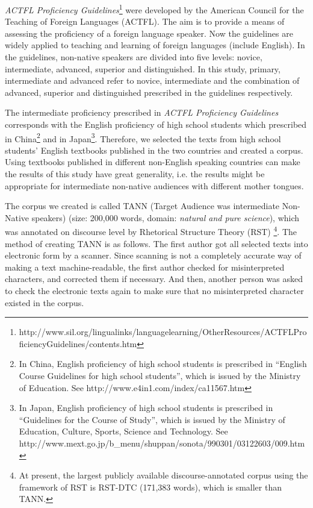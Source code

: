 \documentclass[english]{jnlp_1.3e}
\begin{document}
\textit{ACTFL Proficiency Guidelines}\footnote{http://www.sil.org/lingualinks/languagelearning/OtherResources/ACTFLProficiencyGuidelines/contents.htm} were developed by the American Council for the Teaching of
Foreign Languages (ACTFL). The aim is to provide a means of assessing the proficiency of
a foreign language speaker. Now the guidelines are widely applied to teaching and learning of
foreign languages (include English). In the guidelines, non-native speakers are divided into
five levels: novice, intermediate, advanced, superior and distinguished. In this study, primary, intermediate
and advanced refer to novice, intermediate and the combination of advanced, superior and distinguished 
prescribed in the guidelines respectively.

The intermediate proficiency prescribed in \textit{ACTFL Proficiency Guidelines} corresponds
with the English proficiency of high school students which prescribed in China\footnote{In China, English proficiency of high school students is prescribed in ``English Course Guidelines for high school students'', which is issued by the Ministry of Education. See http://www.e4in1.com/index/ca11567.htm} and in Japan\footnote{In Japan, English proficiency of high school students is prescribed in ``Guidelines for the Course of Study'', which is issued by the Ministry of Education, Culture, Sports, Science and Technology. See http://www.mext.go.jp/b\_menu/shuppan/sonota/990301/03122603/009.htm}.
Therefore, we selected the texts from high school students' English textbooks published in
the two countries and created a corpus. Using textbooks published in different non-English
speaking countries can make the results of this study have great generality, i.e. the results
might be appropriate for intermediate non-native audiences with different mother tongues.

The corpus we created is called TANN (Target Audience was intermediate Non-Native speakers) 
(size: 200,000 words, domain: \textit{natural and pure science}),
which was annotated on discourse level by Rhetorical
Structure Theory (RST) \cite{Mann88}\footnote{At present, 
the largest publicly available discourse-annotated corpus using the framework of RST 
is RST-DTC (171,383 words), which is smaller than TANN.}. 
The method of creating TANN is as follows. The first author got all selected texts into electronic
form by a scanner. Since scanning is not a completely accurate way of making a text
machine-readable, the first author checked for misinterpreted characters, and corrected them
if necessary. And then, another person was asked to check the electronic texts again to make
sure that no misinterpreted character existed in the corpus.
\end{document}
